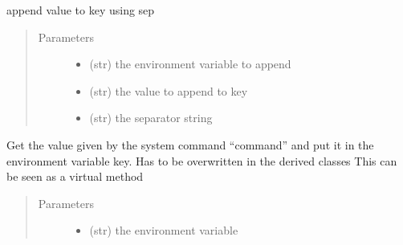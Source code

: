 \documentclass[a4paper,10pt,english]{sphinxmanual}
\begin{document}
\begin{fulllineitems}
\begin{fulllineitems}
\end{fulllineitems}


\begin{fulllineitems}
\label{\detokenize{apidoc_src/src:src.fileEnviron.FileEnviron.append_value}}
append value to key using sep
\begin{quote}\begin{description}
\item[{Parameters}] \leavevmode\begin{itemize}
\item {} 
 \textendash{} (str) the environment variable to append

\item {} 
 \textendash{} (str) the value to append to key

\item {} 
 \textendash{} (str) the separator string

\end{itemize}

\end{description}\end{quote}

\end{fulllineitems}


\begin{fulllineitems}
\label{\detokenize{apidoc_src/src:src.fileEnviron.FileEnviron.command_value}}
Get the value given by the system command “command” 
and put it in the environment variable key.
Has to be overwritten in the derived classes
This can be seen as a virtual method
\begin{quote}\begin{description}
\item[{Parameters}] \leavevmode\begin{itemize}
\item {} 
 \textendash{} (str) the environment variable


\end{itemize}
\end{description}
\end{quote}
\end{fulllineitems}
\end{fulllineitems}
\end{document}
